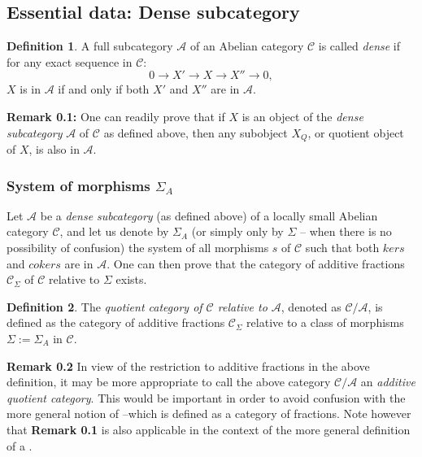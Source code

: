 \documentclass[12pt]{article}
\theoremstyle{plain}
\theoremstyle{definition}
\newtheorem{definition}{Definition}[section]
\numberwithin{equation}{section}
\begin{document}
\subsection{Essential data: Dense subcategory}
\begin{definition}
A full subcategory $\mathcal{A}$ of an Abelian category $\mathcal{C}$ is called \emph{dense} if for any exact sequence in $\mathcal{C}$:
$$ 0 \to X' \to X \to X'' \to 0,$$
$X$ is in $\mathcal{A}$ if and only if both $X'$ and $X''$ are in $\mathcal{A}$. 
\end{definition}


\textbf{Remark 0.1:}
One can readily prove that if $X$ is an object of the \emph{dense subcategory} $\mathcal{A}$ of
$\mathcal{C}$ as defined above, then any subobject $X_Q$, or quotient object of $X$, is also in
$\mathcal{A}$. \\

\subsubsection{System of morphisms $\Sigma_A$}
Let $\mathcal{A}$ be a \emph{dense subcategory} (as defined above) of a locally small Abelian category $\mathcal{C}$, 
and let us denote by $\Sigma_A$ (or simply only by $\Sigma$ -- when there is no possibility of confusion) 
the system of all morphisms $s$ of $\mathcal{C}$ such that both $ker s$ and $coker s$ are in $\mathcal{A}$.
One can then prove that the category of additive fractions $\mathcal{C}_{\Sigma}$ of $\mathcal{C}$
relative to $\Sigma$ exists.

\begin{definition}
The \emph{quotient category of $\mathcal{C}$ relative to $\mathcal{A}$}, denoted as $\mathcal{C}/\mathcal{A}$, is defined as the category of additive fractions $\mathcal{C}_{\Sigma}$ relative to a class of morphisms 
$\Sigma :=\Sigma_A $ in $\mathcal{C}$.  
\end{definition}
\textbf{Remark 0.2}
In view of the restriction to additive fractions in the above definition, it may be more
appropriate to call the above category $\mathcal{C}/\mathcal{A}$ an \emph{additive quotient category}.
This would be important in order to avoid confusion with the more general notion of 
--which is defined as a category of fractions. Note however that \textbf{Remark 0.1} is also applicable in the context of the more general definition of a .

\end{document}
